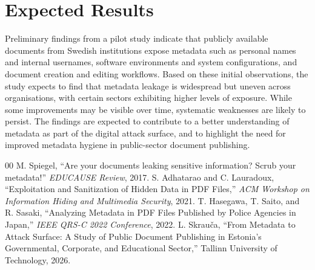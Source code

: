 \documentclass[conference]{IEEEtran}
\begin{document}
\section{Expected Results}

Preliminary findings from a pilot study indicate that publicly available documents from Swedish institutions expose metadata such as personal names and internal usernames, software environments and system configurations, and document creation and editing workflows. Based on these initial observations, the study expects to find that metadata leakage is widespread but uneven across organisations, with certain sectors exhibiting higher levels of exposure. While some improvements may be visible over time, systematic weaknesses are likely to persist. The findings are expected to contribute to a better understanding of metadata as part of the digital attack surface, and to highlight the need for improved metadata hygiene in public-sector document publishing.
\clearpage %
\begin{thebibliography}{00}
 M. Spiegel, ``Are your documents leaking sensitive information? Scrub your metadata!'' \textit{EDUCAUSE Review}, 2017.
 S. Adhatarao and C. Lauradoux, ``Exploitation and Sanitization of Hidden Data in PDF Files,'' \textit{ACM Workshop on Information Hiding and Multimedia Security}, 2021.
 T. Hasegawa, T. Saito, and R. Sasaki, ``Analyzing Metadata in PDF Files Published by Police Agencies in Japan,'' \textit{IEEE QRS-C 2022 Conference}, 2022.
 L. Skrau\v{c}a, ``From Metadata to Attack Surface: A Study of Public Document Publishing in Estonia's Governmental, Corporate, and Educational Sector,'' Tallinn University of Technology, 2026.
\end{thebibliography}
\end{document}
